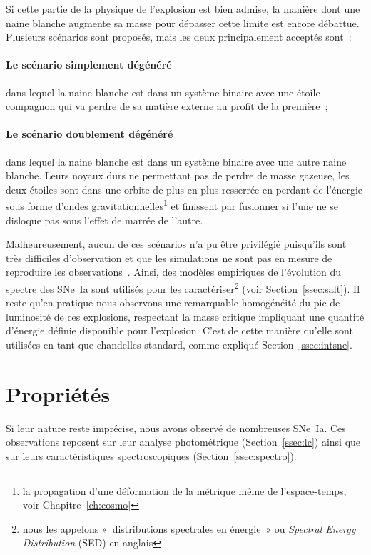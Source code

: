 \documentclass[../main/main.tex]{subfiles}
\begin{document}
Si cette partie de la physique de l'explosion est bien admise, la manière dont
une naine blanche augmente sa masse pour dépasser cette limite est encore
débattue. Plusieurs scénarios sont proposés, mais les deux principalement
acceptés sont~:
\paragraph*{Le scénario simplement dégénéré\!\!} \citep{whelan1973} dans lequel la
naine blanche est dans un système binaire avec une étoile compagnon qui va
perdre de sa matière externe au profit de la première~;
\paragraph*{Le scénario doublement dégénéré\!\!} \citep{webbink1984} dans lequel
la naine blanche est dans un système binaire avec une autre naine blanche. Leurs
noyaux durs ne permettant pas de perdre de masse gazeuse, les deux étoiles sont
dans une orbite de plus en plus resserrée en perdant de l'énergie sous forme
d'ondes gravitationnelles\footnote{la propagation d'une déformation de la
métrique même de l'espace-temps, voir Chapitre~\ref{ch:cosmo}} et finissent par
fusionner si l'une ne se disloque pas sous l'effet de marrée de l'autre.

Malheureusement, aucun de ces scénarios n'a pu être privilégié puisqu'ils sont
très difficiles d'observation et que les simulations ne sont pas en mesure de
reproduire les observations~\citep{ropke2012}. Ainsi, des modèles empiriques de
l'évolution du spectre des SNe~Ia sont utilisés pour les
caractériser\footnote{nous les appelons «~distributions spectrales en énergie~»
ou \textit{Spectral Energy Distribution} (SED) en anglais} (voir
Section~\ref{ssec:salt}). Il reste qu'en pratique nous observons une remarquable
homogénéité du pic de luminosité de ces explosions, respectant la masse critique
impliquant une quantité d'énergie définie disponible pour l'explosion. C'est de
cette manière qu'elle sont utilisées en tant que chandelles standard, comme
expliqué Section~\ref{ssec:intsne}.

\section{Propriétés}\label{sec:sneprop}

Si leur nature reste imprécise, nous avons observé de nombreuses SNe~Ia. Ces
observations reposent sur leur analyse photométrique (Section~\ref{ssec:lc})
ainsi que sur leurs caractéristiques spectroscopiques
(Section~\ref{ssec:spectro}).
\end{document}

